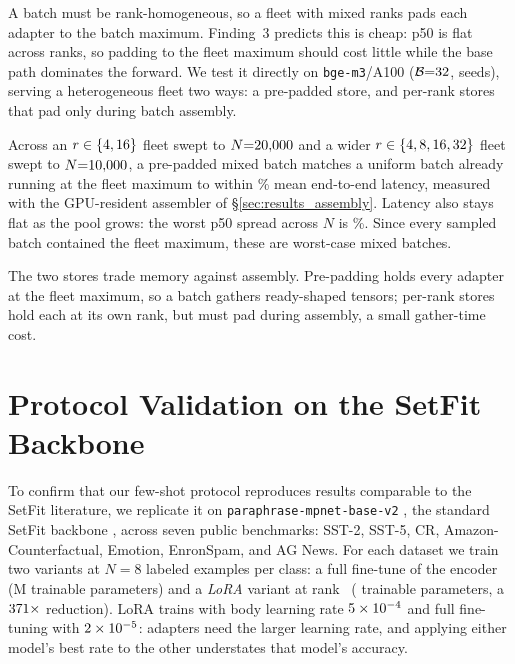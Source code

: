 \documentclass[11pt]{article}
\begin{document}
A batch must be rank-homogeneous, so a fleet with mixed ranks pads each adapter
to the batch maximum. Finding~3 predicts this is cheap: p50 is flat across
ranks, so padding to the fleet maximum should cost little while the base path
dominates the forward. We test it directly on \texttt{bge-m3}/A100
($\mathcal{B}{=}32$, \MixedRankSeeds{} seeds), serving a
heterogeneous fleet two ways: a pre-padded store, and per-rank stores that pad
only during batch assembly.

Across an $r \in \{4, 16\}$ fleet swept to $N{=}20{,}000$ and a
wider $r \in \{4, 8, 16, 32\}$ fleet swept to $N{=}10{,}000$,
a pre-padded mixed batch matches a uniform batch already running at the fleet
maximum to within \MixedRankOverheadMaxPct\% mean end-to-end latency, measured
with the GPU-resident assembler of \S\ref{sec:results_assembly}. Latency also stays flat as
the pool grows: the worst p50 spread across $N$ is \MixedRankSpreadMaxPct\%.
Since every sampled batch contained the fleet maximum, these are worst-case
mixed batches.

The two stores trade memory against assembly. Pre-padding holds every adapter at
the fleet maximum, so a batch gathers ready-shaped tensors; per-rank stores hold
each at its own rank, but must pad during assembly, a small gather-time cost.
\section{Protocol Validation on the SetFit Backbone}
\label{app:accuracy}

To confirm that our few-shot protocol reproduces results comparable to the
SetFit literature, we replicate it on \texttt{paraphrase-mpnet-base-v2}
\cite{reimers2019sentencebert}, the standard SetFit backbone
\cite{tunstall2022efficient}, across seven public benchmarks: SST-2, SST-5, CR,
Amazon-Counterfactual, Emotion, EnronSpam, and AG News. For each dataset we train two variants at $N{=}8$ labeled examples per
class: a full fine-tune of the encoder (\MpnetVanillaParamsM{}M trainable
parameters) and a \emph{LoRA} variant at rank~\HeadlineRank{}
(\MpnetLoraParams{} trainable parameters, a
$371\times$ reduction). LoRA trains with body
learning rate $5\times10^{-4}$ and full fine-tuning with $2\times10^{-5}$:
adapters need the larger learning rate, and applying either model's best rate
to the other understates that model's accuracy.
\end{document}
